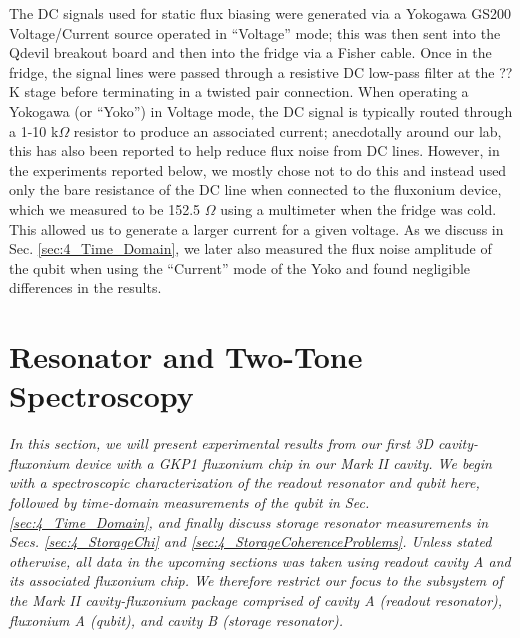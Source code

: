 The DC signals used for static flux biasing were generated via a Yokogawa GS200 Voltage/Current source operated in ``Voltage'' mode; this was then sent into the Qdevil breakout board and then into the fridge via a Fisher cable. Once in the fridge, the signal lines were passed through a resistive DC low-pass filter at the ??K stage  before terminating in a twisted pair connection. When operating a Yokogawa (or ``Yoko'') in Voltage mode, the DC signal is typically routed through a 1-10 k$\Omega$ resistor to produce an associated current; anecdotally around our lab, this has also been reported to help reduce flux noise from DC lines. However, in the experiments reported below, we mostly chose not to do this and instead used only the bare resistance of the DC line when connected to the fluxonium device, which we measured to be 152.5 $\Omega$ using a multimeter when the fridge was cold. This allowed us to generate a larger current for a given voltage. As we discuss in Sec. \ref{sec:4_Time_Domain}, we later also measured the flux noise amplitude of the qubit when using the ``Current'' mode of the Yoko and found negligible differences in the results. 

\section{Resonator and Two-Tone Spectroscopy}

\textit{In this section, we will present experimental results from our first 3D cavity-fluxonium device with a GKP1 fluxonium chip in our Mark II cavity. We begin with a spectroscopic characterization of the readout resonator and qubit here, followed by time-domain measurements of the qubit in Sec. \ref{sec:4_Time_Domain}, and finally discuss storage resonator measurements in Secs. \ref{sec:4_StorageChi} and \ref{sec:4_StorageCoherenceProblems}. Unless stated otherwise, all data in the upcoming sections was taken using readout cavity A and its associated fluxonium chip. We therefore restrict our focus to the subsystem of the Mark II cavity-fluxonium package comprised of cavity A (readout resonator), fluxonium A (qubit), and cavity B (storage resonator).}

